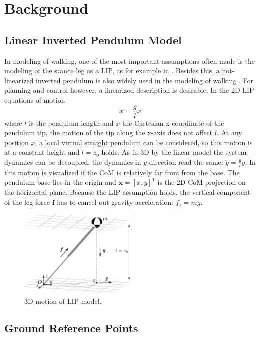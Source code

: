 %
\chapter{Background}
\section{Linear Inverted Pendulum Model}
In modeling of walking, one of the most important assumptions often made is the modeling of the stance leg as a \acf{LIP}, as for example in \cite{kajita20013d}. Besides this, a not-linearized inverted pendulum is also widely used in the modeling of walking \cite{kuo2005energetic}. For planning and control however, a linearized description is desirable. In the \ac{2D} \ac{LIP} equations of motion
\begin{equation}
\ddot{x}=\frac{g}{l}x
\label{eq:LIPeom}
\end{equation}
where $l$ is the pendulum length and $x$ the Cartesian x-coordinate of the pendulum tip, the motion of the tip along the x-axis does not affect $l$. At any position $x$, a local virtual straight pendulum can be considered, so this motion is at a constant height and $l=z_0$  holds. As in \ac{3D} by the linear model the system dynamics can be decoupled, the dynamics in $y$-direction read the same: $\ddot{y}=\frac{g}{l} y$. In  this motion is visualized if the \ac{CoM} is relatively far from from the base. The pendulum base lies in the origin and $\boldsymbol{x} = [x,y]^T$ is the \ac{2D} \ac{CoM} projection on the horizontal plane. Because the \ac{LIP} assumption holds, the vertical component of the leg force $\boldsymbol{f}$ has to cancel out gravity acceleration: $f_z=mg$.
\begin{figure}[h]
\centering
\includegraphics[width=0.5\textwidth]{STYLESTUFF/3DCoMwithoutfoot.png}
\caption{\ac{3D} motion of \ac{LIP} model.}
\label{fig:3dlip}
\end{figure}

\section{Ground Reference Points}


